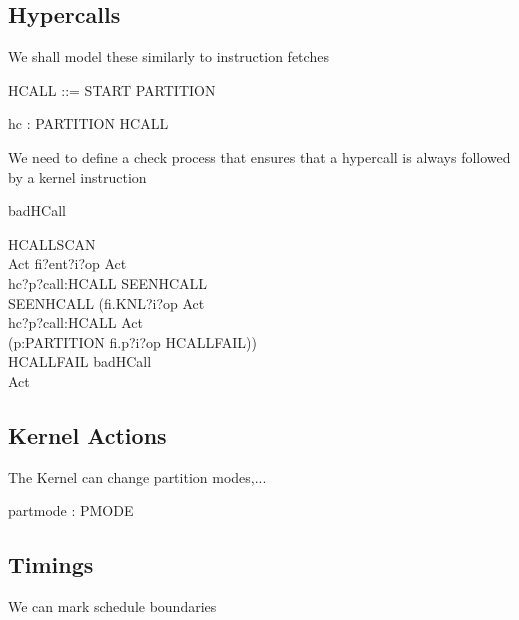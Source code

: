 \subsection{Hypercalls } %
   We shall model these similarly to instruction fetches

\begin{circus}
HCALL ::= START \ldata PARTITION \rdata %
\end{circus}
\begin{circus}
\circchannel hc : PARTITION \cross HCALL  %
\end{circus}

 We need to define a check process that ensures that a hypercall is always
followed by a kernel instruction
\begin{circus}
	\circchannel badHCall
\end{circus}
\begin{circus}
\circprocess HCALLSCAN \circdef \circbegin\\
  Act \circdef fi?ent?i?op     \then  Act\\
              \extchoice  hc?p?call:HCALL \then  SEENHCALL\\
  SEENHCALL \circdef (fi.KNL?i?op     \then  Act\\
	             \extchoice  hc?p?call:HCALL \then  Act\\
	             \extchoice  (\Extchoice  p:PARTITION \circspot fi.p?i?op \then  HCALLFAIL))\\
  HCALLFAIL \circdef badHCall \then  \Stop\\
\circspot Act\\
\circend

\end{circus}

\subsection{Kernel Actions}%
  The Kernel can change partition modes,...

\begin{circus}
	\circchannel partmode : PMODE
\end{circus}
\subsection{Timings}%
  We can mark schedule boundaries

